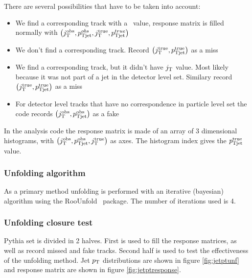 There are several possibilities that have to be taken into account:
\begin{itemize}
\item We find a corresponding track with a \jt{} value, response matrix is filled normally with $\left(j_{\rm T}^\mathrm{obs},p_{\rm Tjet}^{obs},j_{\rm T}^\mathrm{true},p_{\rm Tjet}^{true}\right)$
\item We don't find a corresponding track. Record $\left(j_{\rm T}^\mathrm{true},p_{\rm Tjet}^\mathrm{true}\right)$ as a miss 
\item We find a corresponding track, but it didn't have $j_{\rm T}$ value. Most likely because it was not part of a jet in the detector level set. Similary record $\left(j_{\rm T}^\mathrm{true},p_{\rm Tjet}^\mathrm{true}\right)$ as a miss
\item For detector level tracks that have no correspondence in particle level set the code records  $\left(j_{\rm T}^\mathrm{obs},p_{\rm Tjet}^\mathrm{obs}\right)$ as a fake
\end{itemize}

In the analysis code the response matrix is made of an array of 3 dimensional histograms, with $\left(j_{\rm T}^\mathrm{obs},p_{\rm Tjet}^\mathrm{obs},j_{\rm T}^\mathrm{true}\right)$ as axes. The histogram index gives the $p_{\rm Tjet}^\mathrm{true}$ value.

\subsubsection{Unfolding algorithm}
As a primary method unfolding is performed with an iterative (bayesian) algorithm using the RooUnfold~\cite{roounfold} package. The number of iterations used is 4. 


\subsubsection{Unfolding  closure test}
Pythia set is divided in 2 halves. First is used to fill the response matrices, as well as record missed and fake tracks. Second half is used to test the effectiveness of the unfolding method. Jet $p_{\rm T}$ distributions are shown in figure \ref{fig:jetptunf} and response matrix are shown in figure \ref{fig:jetptresponse}.
 
